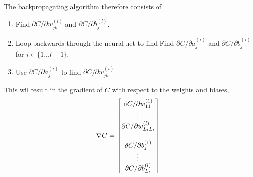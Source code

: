 The backpropagating algorithm therefore consists of 
\begin{enumerate}
    \item Find $\partial C / \partial w^{(l)}_{jk}$ and $\partial C / \partial b^{(l)}_{j}$.
    \item Loop backwards through the neural net to find Find $\partial C / \partial a^{(i)}_{j}$ and $\partial C / \partial b^{(i)}_{j}$ for $i \in \{1 ... l-1 \}$.
    \item Use $\partial C / \partial a^{(i)}_{j}$ to find $\partial C / \partial w^{(i)}_{jk}$-
\end{enumerate}
This wil result in the gradient of $C$ with respect to the weights and biases, 
$$
    \nabla C =
    \begin{bmatrix}
        \partial C / \partial w^{(1)}_{11} \\
        \vdots \\
        \partial C/\partial w^{(l)}_{L_lL_l} \\
        \vspace{1px}\\
        \partial C/\partial b^{(1)}_{j} \\
        \vdots \\
        \partial C /\partial b^{(l)}_{L_l} \\
    \end{bmatrix}
$$
